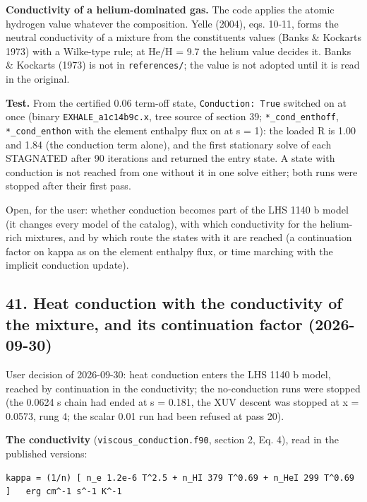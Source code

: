 \documentclass[english,a4paper]{my_memo}
\begin{document}
\textbf{Conductivity of a helium-dominated gas.} The code applies the atomic
hydrogen value whatever the composition. Yelle (2004), eqs. 10-11, forms
the neutral conductivity of a mixture from the constituents\textquotesingle{} values
(Banks \& Kockarts 1973) with a Wilke-type rule; at He/H = 9.7 the helium
value decides it. Banks \& Kockarts (1973) is not in \texttt{references/}; the value
is not adopted until it is read in the original.

\textbf{Test.} From the certified 0.06 term-off state, \texttt{Conduction:\ True}
switched on at once (binary \texttt{EXHALE\_a1c14b9c.x}, tree source of section 39;
\texttt{*\_cond\_enthoff}, \texttt{*\_cond\_enthon} with the element enthalpy flux on at
s = 1): the loaded \textbar\textbar R\textbar\textbar{} is 1.00 and 1.84 (the conduction term alone), and
the first stationary solve of each STAGNATED after 90 iterations and
returned the entry state. A state with conduction is not reached from one
without it in one solve either; both runs were stopped after their first
pass.

Open, for the user: whether conduction becomes part of the LHS 1140 b model
(it changes every model of the catalog), with which conductivity for the
helium-rich mixtures, and by which route the states with it are reached (a
continuation factor on kappa as on the element enthalpy flux, or time
marching with the implicit conduction update).

\subsection{41. Heat conduction with the conductivity of the mixture, and its continuation factor (2026-09-30)}\label{41-heat-conduction-with-the-conductivity-of-the-mixture-and-its-continuation-factor-2026-09-30}

User decision of 2026-09-30: heat conduction enters the LHS 1140 b model,
reached by continuation in the conductivity; the no-conduction runs were
stopped (the 0.0624 s chain had ended at s = 0.181, the XUV descent was
stopped at x = 0.0573, rung 4; the scalar 0.01 run had been refused at
pass 20).

\textbf{The conductivity} (\texttt{viscous\_conduction.f90}, section 2, Eq. 4\textquotesingle), read in
the published versions:

\begin{verbatim}
kappa = (1/n) [ n_e 1.2e-6 T^2.5 + n_HI 379 T^0.69 + n_HeI 299 T^0.69 ]   erg cm^-1 s^-1 K^-1
\end{verbatim}
\end{document}
